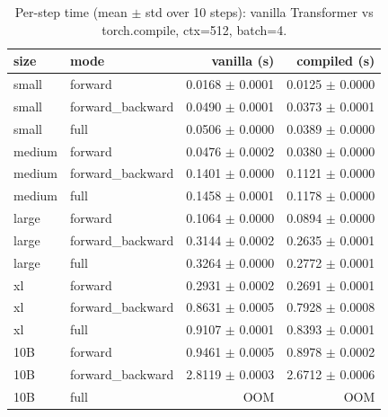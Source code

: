 \begin{table}
\centering
\begin{tabular}{llrr}
\toprule
size & mode & vanilla (s) & compiled (s) \\
\midrule
small & forward & 0.0168 $\pm$ 0.0001 & 0.0125 $\pm$ 0.0000 \\
small & forward_backward & 0.0490 $\pm$ 0.0001 & 0.0373 $\pm$ 0.0001 \\
small & full & 0.0506 $\pm$ 0.0000 & 0.0389 $\pm$ 0.0000 \\
medium & forward & 0.0476 $\pm$ 0.0002 & 0.0380 $\pm$ 0.0000 \\
medium & forward_backward & 0.1401 $\pm$ 0.0000 & 0.1121 $\pm$ 0.0000 \\
medium & full & 0.1458 $\pm$ 0.0001 & 0.1178 $\pm$ 0.0000 \\
large & forward & 0.1064 $\pm$ 0.0000 & 0.0894 $\pm$ 0.0000 \\
large & forward_backward & 0.3144 $\pm$ 0.0002 & 0.2635 $\pm$ 0.0001 \\
large & full & 0.3264 $\pm$ 0.0000 & 0.2772 $\pm$ 0.0001 \\
xl & forward & 0.2931 $\pm$ 0.0002 & 0.2691 $\pm$ 0.0001 \\
xl & forward_backward & 0.8631 $\pm$ 0.0005 & 0.7928 $\pm$ 0.0008 \\
xl & full & 0.9107 $\pm$ 0.0001 & 0.8393 $\pm$ 0.0001 \\
10B & forward & 0.9461 $\pm$ 0.0005 & 0.8978 $\pm$ 0.0002 \\
10B & forward_backward & 2.8119 $\pm$ 0.0003 & 2.6712 $\pm$ 0.0006 \\
10B & full & OOM & OOM \\
\bottomrule
\end{tabular}
\caption{Per-step time (mean $\pm$ std over 10 steps): vanilla Transformer vs torch.compile, ctx=512, batch=4.}
\label{tab:transformer_compile_compare}
\end{table}
